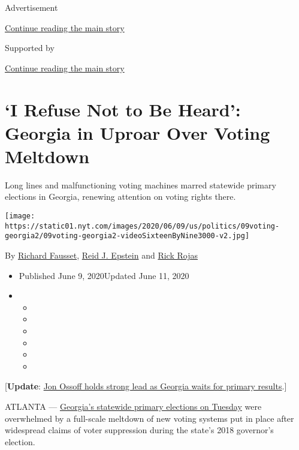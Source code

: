 Advertisement

\protect\hyperlink{after-top}{Continue reading the main story}

Supported by

\protect\hyperlink{after-sponsor}{Continue reading the main story}

\hypertarget{i-refuse-not-to-be-heard-georgia-in-uproar-over-voting-meltdown}{%
\section{`I Refuse Not to Be Heard': Georgia in Uproar Over Voting
Meltdown}\label{i-refuse-not-to-be-heard-georgia-in-uproar-over-voting-meltdown}}

Long lines and malfunctioning voting machines marred statewide primary
elections in Georgia, renewing attention on voting rights there.

\texttt{[image: https://static01.nyt.com/images/2020/06/09/us/politics/09voting-georgia2/09voting-georgia2-videoSixteenByNine3000-v2.jpg]}

By \href{https://www.nytimes.com/by/richard-fausset}{Richard Fausset},
\href{https://www.nytimes.com/by/reid-j-epstein}{Reid J. Epstein} and
\href{https://www.nytimes.com/by/rick-rojas}{Rick Rojas}

\begin{itemize}
\item
  Published June 9, 2020Updated June 11, 2020
\item
  \begin{itemize}
  \item
  \item
  \item
  \item
  \item
  \item
  \end{itemize}
\end{itemize}

{[}\textbf{Update}:
\href{https://www.nytimes.com/2020/06/10/us/politics/jon-ossoff-georgia-senate.html}{Jon
Ossoff holds strong lead as Georgia waits for primary results}.{]}

ATLANTA ---
\href{https://www.nytimes.com/2020/06/10/us/politics/georgia-primary-election-voting.html}{Georgia's
statewide primary elections on Tuesday} were overwhelmed by a full-scale
meltdown of new voting systems put in place after widespread claims of
voter suppression during the state's 2018 governor's election.

